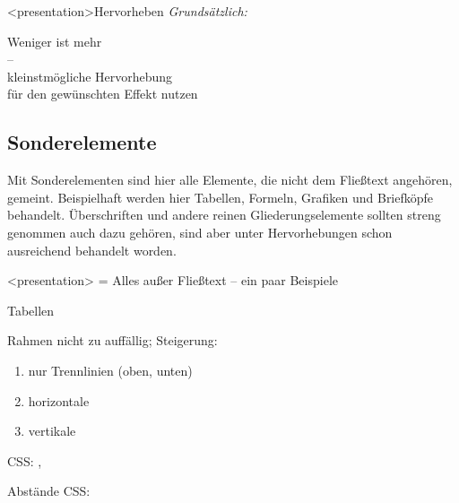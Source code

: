 \begin{frame}<presentation>{Hervorheben}
  \centering
  \emph{Grundsätzlich:~}

  \vspace*{1.5\baselineskip}
  Weniger ist mehr\\ – \\
  kleinstmögliche Hervorhebung\\
  für den gewünschten Effekt nutzen
\end{frame}


\subsection{Sonderelemente}
Mit Sonderelementen sind hier alle Elemente, die nicht dem Fließtext
angehören, gemeint. Beispielhaft werden hier Tabellen, Formeln,
Grafiken und Briefköpfe behandelt. Überschriften und andere reinen 
Gliederungselemente sollten streng genommen auch dazu gehören, sind
aber unter Hervorhebungen schon ausreichend behandelt worden.
\begin{frame}<presentation>
  \subsectionpage
  \centering
  = Alles außer Fließtext – ein paar Beispiele
\end{frame}

\begin{frame}{Tabellen}
  \begin{block}{Rahmen}
    nicht zu auffällig; Steigerung:
    \begin{enumerate}
    \item nur Trennlinien (oben, unten)
    \item horizontale
    \item vertikale
    \end{enumerate}
    CSS: , 
  \end{block}
  \begin{block}{Abstände}
    CSS: 
  \end{block}
\end{frame}

